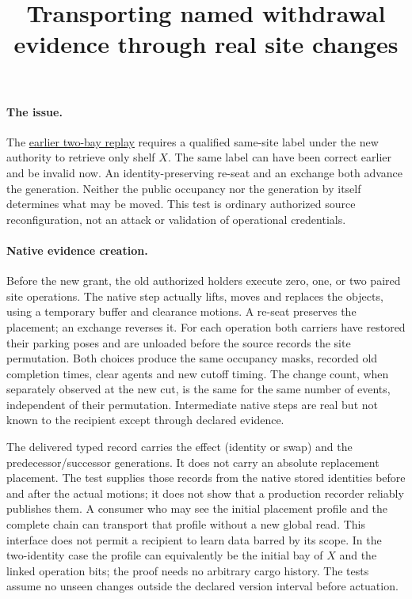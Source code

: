 \documentclass[11pt]{article}
\title{Transporting named withdrawal evidence through real site changes}
\date{}
\begin{document}
\maketitle

\paragraph{The issue.}
The
\href{https://github.com/eternal-november/eos-research-programmes/pull/584}
{earlier two-bay replay} requires a qualified same-site label under the
new authority to retrieve only shelf $X$. The same label can have been
correct earlier and be invalid now. An identity-preserving re-seat
and an exchange both advance the generation. Neither the public
occupancy nor the generation by itself determines what may be moved.
This test is ordinary authorized source reconfiguration, not an
attack or validation of operational credentials.

\paragraph{Native evidence creation.}
Before the new grant, the old authorized holders execute zero, one,
or two paired site operations. The native step actually lifts,
moves and replaces the objects, using a temporary buffer and
clearance motions. A re-seat preserves the placement; an exchange
reverses it. For each operation both carriers have restored their
parking poses and are unloaded before the source records the
site permutation. Both choices produce the same occupancy masks,
recorded old completion times, clear agents and new cutoff
timing. The change count, when separately observed at the new
cut, is the same for the same number of events, independent of
their permutation. Intermediate native steps are real but not
known to the recipient except through declared evidence.

The delivered typed record carries the effect (identity or swap)
and the predecessor/successor generations. It does not carry an
absolute replacement placement. The test supplies those records
from the native stored identities before and after the actual
motions; it does not show that a production recorder reliably
publishes them. A consumer who may see the initial placement
profile and the complete chain can transport that profile
without a new global read. This interface does not permit a
recipient to learn data barred by its scope. In the two-identity
case the profile can equivalently be the initial bay of $X$ and
the linked operation bits; the proof needs no arbitrary cargo
history. The tests assume no unseen changes outside the declared
version interval before actuation.
\end{document}
